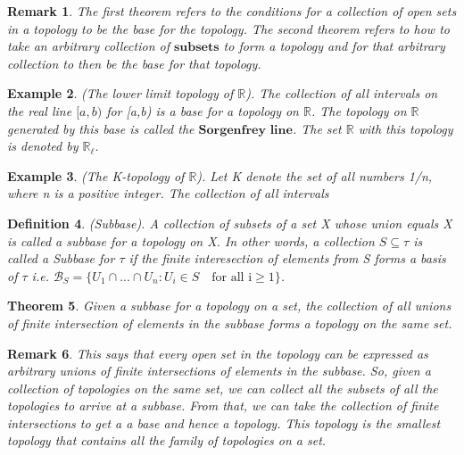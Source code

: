 \documentclass[twoside]{article}
\newcounter{lecnum}
\newtheorem{theorem}{Theorem}[lecnum]
\newtheorem{definition}[theorem]{Definition}
\newtheorem{remark}[theorem]{Remark}
\newtheorem{example}[theorem]{Example}
\begin{document}
\begin{remark}The first theorem refers to the conditions for a collection of open sets in a topology to be the base for the topology. The second theorem refers to how to take an arbitrary collection of $\textbf{subsets}$ to form a topology and for that arbitrary collection to then be the base for that topology.
\end{remark}

\begin{example}(The lower limit topology of $\mathbb{R}$). The collection of all intervals on the real line $[a,b)$ for [a,b) is a base for a topology on $\mathbb{R}$. The topology on $\mathbb{R}$ generated by this base is called the $\textbf{Sorgenfrey line}$. The set $\mathbb{R}$ with this topology is denoted by $\mathbb{R}_{\ell}$.
\end{example}

\begin{example}(The K-topology of $\mathbb{R}$). Let K denote the set of all numbers 1/n, where n is a positive integer. The collection of all intervals
\end{example}

\begin{definition}(Subbase). A collection of subsets of a set X whose union equals X is called a subbase for a topology on X. In other words, a collection $S \subseteq \tau$ is called a Subbase for $\tau$ if the finite interesection of elements from S forms a basis of $\tau$ i.e. $\mathcal{B}_S = \{U_1 \cap ... \cap U_n: U_i \in S \quad \text{for all i} \geq 1\}$.
\end{definition}

\begin{theorem}Given a subbase for a topology on a set, the collection of all unions of finite intersection of elements in the subbase forms a topology on the same set. 
\end{theorem}

\begin{remark}This says that every open set in the topology can be expressed as arbitrary unions of finite intersections of elements in the subbase. So, given a collection of topologies on the same set, we can collect all the subsets of all the topologies to arrive at a subbase. From that, we can take the collection of finite intersections to get a a base and hence a topology. This topology is the smallest topology that contains all the family of topologies on a set. 
\end{remark}
\end{document}
